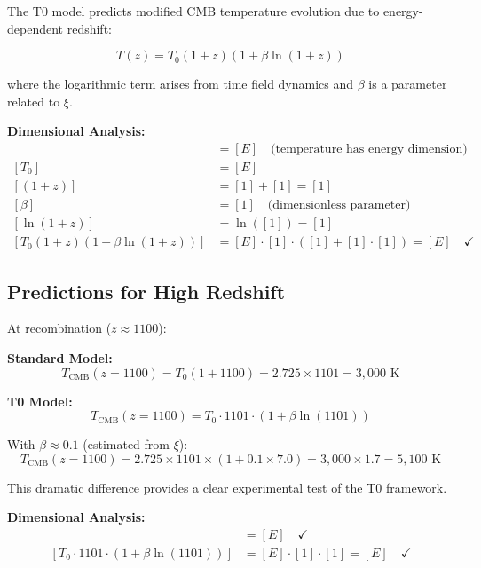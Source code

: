 \documentclass[12pt,a4paper]{report}
\begin{document}
	The T0 model predicts modified CMB temperature evolution due to energy-dependent redshift:
	
	\begin{equation}
		\boxed{T(z) = T_0(1+z)\left(1 + \beta \ln(1+z)\right)}
		\label{eq:cmb_temperature_evolution}
	\end{equation}
	
	where the logarithmic term arises from time field dynamics and $\beta$ is a parameter related to $\xi$.
	
	\textbf{Dimensional Analysis:}
	\begin{align}
		[T(z)] &= [E] \quad \text{(temperature has energy dimension)} \\
		[T_0] &= [E] \\
		[(1+z)] &= [1] + [1] = [1] \\
		[\beta] &= [1] \quad \text{(dimensionless parameter)} \\
		[\ln(1+z)] &= \ln([1]) = [1] \\
		[T_0(1+z)(1 + \beta \ln(1+z))] &= [E] \cdot [1] \cdot ([1] + [1] \cdot [1]) = [E] \quad \checkmark
	\end{align}
	
	\subsection{Predictions for High Redshift}
	\label{subsec:high_redshift_predictions}
	
	At recombination ($z \approx 1100$):
	
	\textbf{Standard Model:}
	\begin{equation}
		T_{\text{CMB}}(z = 1100) = T_0(1 + 1100) = 2.725 \times 1101 = 3,000 \text{ K}
	\end{equation}
	
	\textbf{T0 Model:}
	\begin{equation}
		T_{\text{CMB}}(z = 1100) = T_0 \cdot 1101 \cdot (1 + \beta \ln(1101))
	\end{equation}
	
	With $\beta \approx 0.1$ (estimated from $\xi$):
	\begin{equation}
		T_{\text{CMB}}(z = 1100) = 2.725 \times 1101 \times (1 + 0.1 \times 7.0) = 3,000 \times 1.7 = 5,100 \text{ K}
	\end{equation}
	
	This dramatic difference provides a clear experimental test of the T0 framework.
	
	\textbf{Dimensional Analysis:}
	\begin{align}
		[T_{\text{CMB}}(z = 1100)] &= [E] \quad \checkmark \\
		[T_0 \cdot 1101 \cdot (1 + \beta \ln(1101))] &= [E] \cdot [1] \cdot [1] = [E] \quad \checkmark
	\end{align}
	
\end{document}
